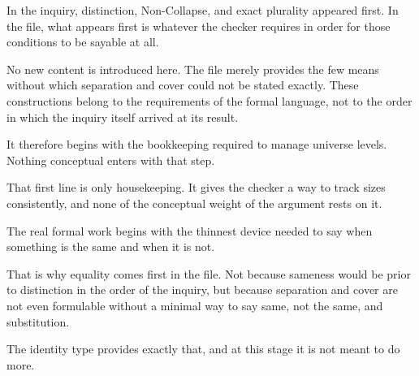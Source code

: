 \documentclass[11pt,a4paper]{book}
\begin{document}
In the inquiry, distinction, Non-Collapse, and exact plurality appeared
first. In the file, what appears first is whatever the checker requires in
order for those conditions to be sayable at all.

No new content is introduced here. The file merely provides the few means
without which separation and cover could not be stated exactly. These 
constructions belong to the requirements of the formal language, not
to the order in which the inquiry itself arrived at its result.

It therefore begins with the bookkeeping required to manage universe
levels. Nothing conceptual enters with that step.

\begin{code}%
\>[0]\AgdaSpace{}%
\AgdaSpace{}%
\AgdaSpace{}%
\AgdaSpace{}%
\AgdaSymbol{(}\AgdaSymbol{;}\AgdaSpace{}%
\AgdaSymbol{;}\AgdaSpace{}%
\AgdaSymbol{;}\AgdaSpace{}%
\AgdaSymbol{;}\AgdaSpace{}%
\AgdaSymbol{)}\<%
\end{code}

That first line is only housekeeping. It gives the checker a way to track
sizes consistently, and none of the conceptual weight of the argument rests
on it.

The real formal work begins with the thinnest device needed to say when
something is the same and when it is not.

That is why equality comes first in the file. Not because sameness would be
prior to distinction in the order of the inquiry, but because separation
and cover are not even formulable without a minimal way to say same, not
the same, and substitution.

The identity type provides exactly that, and at this stage it is not meant
to do more.
\end{document}
